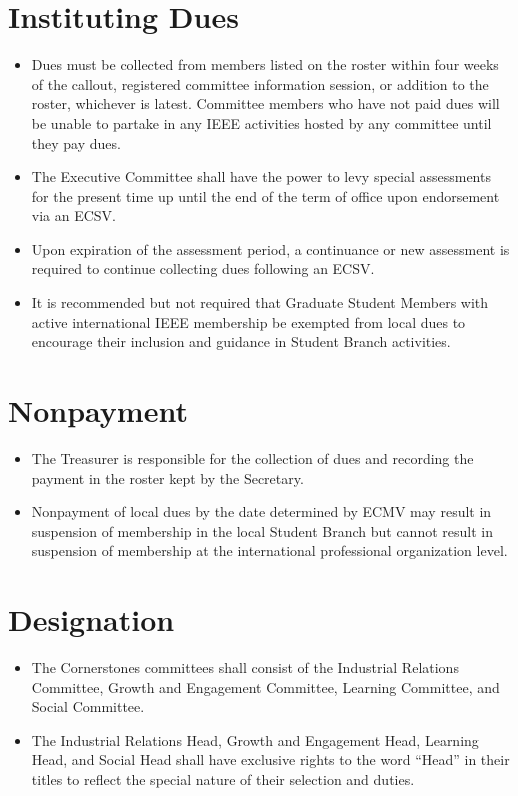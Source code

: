 \documentclass[12pt]{constitution}
\begin{document}
\section{Instituting Dues}
\label{sec:dues_institute}
\begin{itemize}
    \item Dues must be collected from members listed on the roster within four weeks of the callout, registered committee information session, or addition to the roster, whichever is latest. Committee members who have not paid dues will be unable to partake in any IEEE activities hosted by any committee until they pay dues.
    \item The Executive Committee shall have the power to levy special assessments for the present time up until the end of the term of office upon endorsement via an ECSV.
    \item Upon expiration of the assessment period, a continuance or new assessment is required to continue collecting dues following an ECSV.
    \item It is recommended but not required that Graduate Student Members with active international IEEE membership be exempted from local dues to encourage their inclusion and guidance in Student Branch activities.
\end{itemize}

\section{Nonpayment}
\label{sec:dues_nonpay}
\begin{itemize}
    \item The Treasurer is responsible for the collection of dues and recording the payment in the roster kept by the Secretary.
    \item Nonpayment of local dues by the date determined by ECMV may result in suspension of membership in the local Student Branch but cannot result in suspension of membership at the international professional organization level.
\end{itemize}


\label{art:cornerstones}

\section{Designation}
\label{sec:corner_desig}
\begin{itemize}
    \item The Cornerstones committees shall consist of the Industrial Relations Committee, Growth and Engagement Committee, Learning Committee, and Social Committee.
    \item The Industrial Relations Head, Growth and Engagement Head, Learning Head, and Social Head shall have exclusive rights to the word ``Head'' in their titles to reflect the special nature of their selection and duties.
\end{itemize}
\end{document}
